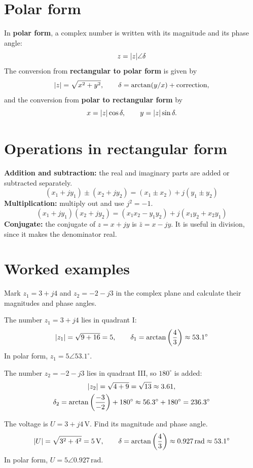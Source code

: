 \section{Polar form}
\label{c15:sec:polar}
In \textbf{polar form}, a complex number is written with its magnitude and its phase angle:
\[
  z = \lvert z\rvert\angle\delta
\]
The conversion from \textbf{rectangular to polar form} is given by
\[
  \lvert z\rvert = \sqrt{x^2 + y^2}, \qquad \delta = \arctan(y/x) + \text{correction},
\]
and the conversion from \textbf{polar to rectangular form} by
\[
  x = \lvert z\rvert\cos\delta, \qquad y = \lvert z\rvert\sin\delta.
\]

\section{Operations in rectangular form}
\label{c15:sec:rakneoperationer}
\textbf{Addition and subtraction:} the real and imaginary parts are added or subtracted
separately.
\[
  (x_1 + jy_1) \pm (x_2 + jy_2) = (x_1 \pm x_2) + j(y_1 \pm y_2)
\]
\textbf{Multiplication:} multiply out and use $j^2 = -1$.
\[
  (x_1 + jy_1)(x_2 + jy_2) = (x_1x_2 - y_1y_2) + j(x_1y_2 + x_2y_1)
\]
\textbf{Conjugate:} the conjugate of $z = x + jy$ is $\bar{z} = x - jy$. It is useful in
division, since it makes the denominator real.

\section{Worked examples}
\label{c15:sec:typexempel}

\begin{exempel}
Mark $z_1 = 3 + j4$ and $z_2 = -2 - j3$ in the complex plane and calculate their magnitudes and
phase angles.

The number $z_1 = 3 + j4$ lies in quadrant I:
\[
  \lvert z_1\rvert = \sqrt{9 + 16} = 5, \qquad
  \delta_1 = \arctan\left(\frac{4}{3}\right) \approx 53.1^{\circ}
\]
In polar form, $z_1 = 5\angle 53.1^{\circ}$.

The number $z_2 = -2 - j3$ lies in quadrant III, so $180^{\circ}$ is added:
\begin{gather*}
  \lvert z_2\rvert = \sqrt{4 + 9} = \sqrt{13} \approx 3.61, \\
  \delta_2 = \arctan\left(\frac{-3}{-2}\right) + 180^{\circ} \approx 56.3^{\circ} + 180^{\circ}
    = 236.3^{\circ}
\end{gather*}
\end{exempel}

\begin{exempel}
The voltage is $U = 3 + j4\,\text{V}$. Find its magnitude and phase angle.
\[
  \lvert U\rvert = \sqrt{3^2 + 4^2} = 5\,\text{V}, \qquad
  \delta = \arctan\left(\frac{4}{3}\right) \approx 0.927\,\text{rad} \approx 53.1^{\circ}
\]
In polar form, $U = 5\angle 0.927\,\text{rad}$.
\end{exempel}

